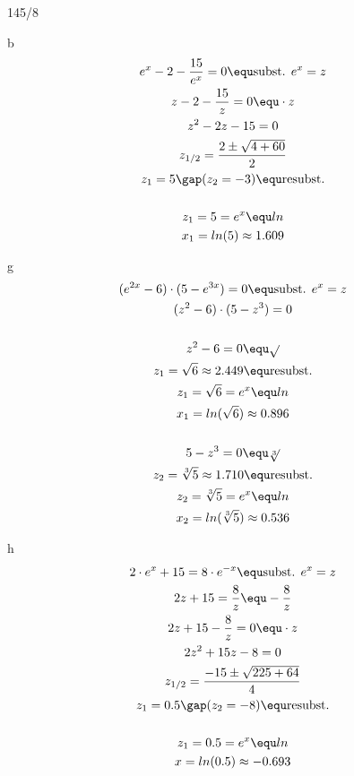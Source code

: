 \begin{exercise}{145/8}
  \item [b]
  \begin{gather*}
    e^x - 2 - \frac{15}{e^x} = 0 \equ \text{subst. } e^x = z \\
    z - 2 - \frac{15}{z} = 0 \equ \cdot z \\
    z^2 - 2z - 15 = 0 \\
    z_{1/2} = \frac{2 \pm \sqrt{4 + 60}}{2} \\
    z_1 = 5 \gap (z_2 = -3) \equ \text{resubst.} \\\\
    z_1 = 5 = e^x \equ ln \\
    x_1 = ln(5) \approx 1.609
  \end{gather*}
  \item [g]
  \begin{gather*}
    (e^{2x} - 6) \cdot (5 - e^{3x}) = 0 \equ \text{subst. } e^x = z \\
    (z^2 - 6) \cdot (5 - z^3) = 0 \\\\
    z^2 - 6 = 0 \equ \sqrt{} \\
    z_1 = \sqrt{6} \approx 2.449 \equ \text{resubst.} \\
    z_1 = \sqrt{6} = e^x \equ ln \\
    x_1 = ln(\sqrt{6}) \approx 0.896 \\\\
    5 - z^3 = 0 \equ \sqrt[3]{} \\
    z_2 = \sqrt[3]{5} \approx 1.710 \equ \text{resubst.} \\
    z_2 = \sqrt[3]{5} = e^x \equ ln \\
    x_2 = ln(\sqrt[3]{5}) \approx 0.536 
  \end{gather*}
  \item [h]
  \begin{gather*}
    2 \cdot e^x + 15 = 8 \cdot e^{-x} \equ \text{subst. } e^x = z \\
    2z + 15 = \frac{8}{z} \equ -\frac{8}{z} \\
    2z + 15 - \frac{8}{z} = 0 \equ \cdot z \\
    2z^2 + 15z - 8 = 0 \\
    z_{1/2} = \frac{-15 \pm \sqrt{225 + 64}}{4} \\
    z_1 = 0.5 \gap (z_2 = -8) \equ \text{resubst.} \\\\
    z_1 = 0.5 = e^x \equ ln \\
    x = ln(0.5) \approx -0.693
  \end{gather*}
\end{exercise}
